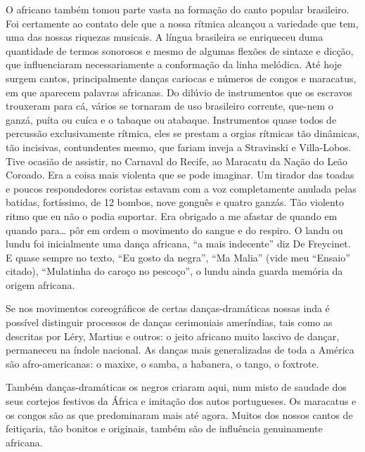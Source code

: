 O africano também tomou parte vasta na formação do canto popular
brasileiro. Foi certamente ao contato dele que a nossa rítmica alcançou
a variedade que tem, uma das nossas riquezas musicais. A língua
brasileira se enriqueceu duma quantidade de termos sonorosos e mesmo de
algumas flexões de sintaxe e dicção, que influenciaram necessariamente a
conformação da linha melódica. Até hoje surgem cantos, principalmente
danças cariocas e números de congos e maracatus, em que aparecem
palavras africanas. Do dilúvio de instrumentos que os escravos trouxeram
para cá, vários se tornaram de uso brasileiro corrente, que-nem o ganzá,
puíta ou cuíca e o tabaque ou atabaque. Instrumentos quase todos de
percussão exclusivamente rítmica, eles se prestam a orgias rítmicas tão
dinâmicas, tão incisivas, contundentes mesmo, que fariam inveja a
Stravinski e Villa-Lobos. Tive ocasião de assistir, no Carnaval do
Recife, ao Maracatu da Nação do Leão Coroado. Era a coisa mais violenta
que se pode imaginar. Um tirador das toadas e poucos respondedores
coristas estavam com a voz completamente anulada pelas batidas,
fortíssimo, de 12 bombos, nove gonguês e quatro ganzás. Tão violento
ritmo que eu não o podia suportar. Era obrigado a me afastar de quando
em quando para\ldots{} pôr em ordem o movimento do sangue e do respiro. O
landu ou lundu foi inicialmente uma dança africana, ``a mais indecente''
diz De Freycinet. E quase sempre no texto, ``Eu gosto da negra'', ``Ma
Malia'' (vide meu ``Ensaio'' citado), ``Mulatinha do caroço no
pescoço'', o lundu ainda guarda memória da origem africana.

Se nos movimentos coreográficos de certas danças-dramáticas nossas inda
é possível distinguir processos de danças cerimoniais ameríndias, tais
como as descritas por Léry, Martius e outros: o jeito africano muito
lascivo de dançar, permaneceu na índole nacional. As danças mais
generalizadas de toda a América são afro-americanas: o maxixe, o samba,
a habanera, o tango, o foxtrote.

Também danças-dramáticas os negros criaram aqui, num misto de saudade
dos seus cortejos festivos da África e imitação dos autos portugueses.
Os maracatus e os congos são as que predominaram mais até agora. Muitos
dos nossos cantos de feitiçaria, tão bonitos e originais, também são de
influência genuinamente africana.

